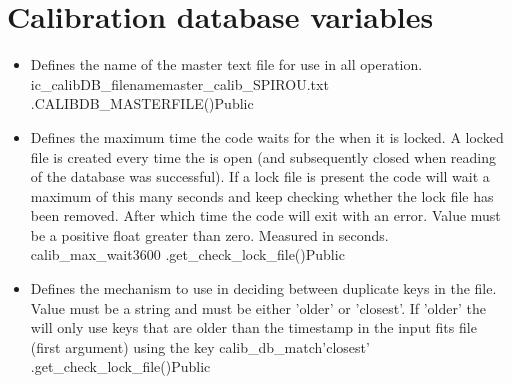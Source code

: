 \clearpage
\newpage
\section{Calibration database variables}
\label{ch:variables:calibdb}

\begin{itemize}

\item {} 
{Defines the name of the master \calibdb text file for use in all \calibdb operation.}
{ic\_calibDB\_filename}{master\_calib{\hskip 0pt}\_SPIROU.txt}
{\AllRecipes}{\constantsfile}{\spirouConst.CALIBDB\_MASTERFILE()}{Public}


\item {}
{Defines the maximum time the code waits for the \calibdb when it is locked. A locked file is created every time the \calibdb is open (and subsequently closed when reading of the database was successful). If a lock file is present the code will wait a maximum of this many seconds and keep checking whether the lock file has been removed. After which time the code will exit with an error. Value must be a positive float greater than zero. Measured in seconds.}
{calib\_max\_wait}{3600}
{\AllRecipes}{\constantsfile}{\spirouCDB.get\_check\_lock\_file()}{Public}


\item {} 
{Defines the mechanism to use in deciding between duplicate keys in the \calibdb file. Value must be a string and must be either 'older' or 'closest'. If 'older' the \calibdb will only use keys that are older than the timestamp in the input fits file (first argument) using the key }
{calib\_db\_match}{'closest'}
{\AllRecipes}{\constantsfile}{\spirouCDB.get\_check\_lock\_file()}{Public}

\end{itemize}








